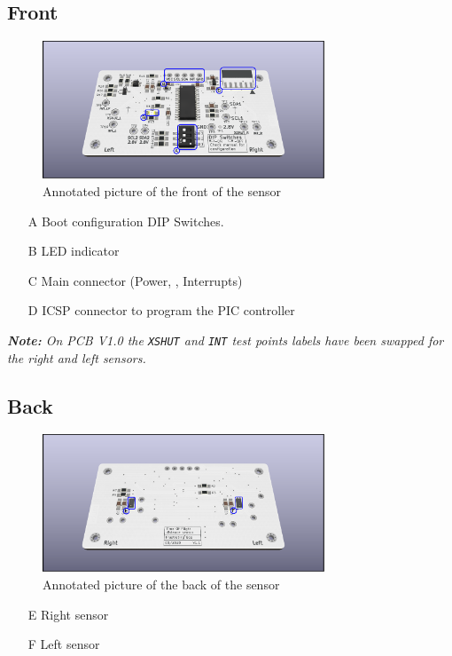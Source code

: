 \subsection{Front}
\begin{figure}[h!]
 \centering
 \includegraphics[width=0.75\textwidth]{../img/V1.1/annotated-layout-front.png}
 \caption{Annotated picture of the front of the sensor}
\end{figure}
\begin{itemize}
 \item[A] Boot configuration DIP Switches.
 \item[B] LED indicator
 \item[C] Main connector (Power, \iic, Interrupts)
 \item[D] ICSP connector to program the PIC controller
\end{itemize}
\textit{\textbf{Note: }On PCB V1.0 the \texttt{XSHUT} and  \texttt{INT} test points labels have been swapped for the right and left sensors.}

\subsection{Back}
\begin{figure}[H]
 \centering
 \includegraphics[width=0.75\textwidth]{../img/V1.1/annotated-layout-back.png}
 \caption{Annotated picture of the back of the sensor}
\end{figure}
\begin{itemize}
 \item[E] Right sensor
 \item[F] Left sensor
\end{itemize}